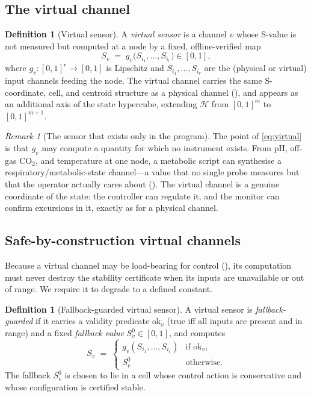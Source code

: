 \documentclass[11pt,a4paper,twocolumn]{article}
\theoremstyle{thmstyle}
\theoremstyle{definition}
\newtheorem{definition}[theorem]{Definition}
\theoremstyle{remark}
\newtheorem{remark}[theorem]{Remark}
\newcommand{\Hs}{\mathcal{H}}
\begin{document}
\subsection{The virtual channel}

\begin{definition}[Virtual sensor]
\label{def:virtual}
A \emph{virtual sensor} is a channel $v$ whose S-value is not measured but
computed at a node by a fixed, offline-verified map
\begin{equation}
\label{eq:virtual}
S_v \;=\; g_v\!\bigl(S_{i_1},\dots,S_{i_r}\bigr)\in[0,1],
\end{equation}
where $g_v\colon[0,1]^r\to[0,1]$ is Lipschitz and $S_{i_1},\dots,S_{i_r}$
are the (physical or virtual) input channels feeding the node. The virtual
channel carries the same S-coordinate, cell, and centroid structure as a
physical channel (), and appears as an additional
axis of the state hypercube, extending $\Hs$ from $[0,1]^m$ to
$[0,1]^{m+1}$.
\end{definition}

\begin{remark}[The sensor that exists only in the program]
\label{rem:only-in-program}
The point of \eqref{eq:virtual} is that $g_v$ may compute a quantity for
which no instrument exists. From pH, off-gas $\mathrm{CO_2}$, and
temperature at one node, a metabolic script can synthesise a
respiratory/metabolic-state channel---a value that no single probe
measures but that the operator actually cares about
(). The virtual channel is a genuine coordinate of
the state: the controller can regulate it, and the monitor can confirm
excursions in it, exactly as for a physical channel.
\end{remark}

\subsection{Safe-by-construction virtual channels}

Because a virtual channel may be load-bearing for control
(), its computation must never destroy the stability
certificate when its inputs are unavailable or out of range. We require it
to degrade to a defined constant.

\begin{definition}[Fallback-guarded virtual sensor]
\label{def:fallback}
A virtual sensor is \emph{fallback-guarded} if it carries a validity
predicate $\mathrm{ok}_v$ (true iff all inputs are present and in range)
and a fixed \emph{fallback value} $S_v^{0}\in[0,1]$, and computes
\begin{equation}
\label{eq:guarded}
S_v \;=\;
\begin{cases}
g_v(S_{i_1},\dots,S_{i_r}) & \text{if }\mathrm{ok}_v,\\[2pt]
S_v^{0} & \text{otherwise.}
\end{cases}
\end{equation}
The fallback $S_v^{0}$ is chosen to lie in a cell whose control action is
conservative and whose configuration is certified stable.
\end{definition}
\end{document}
